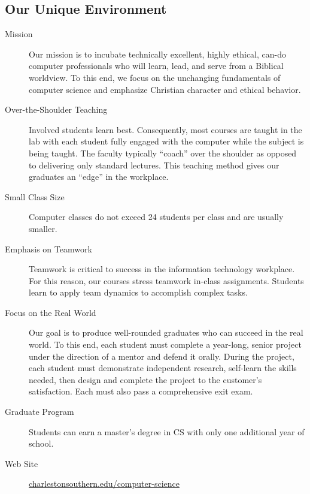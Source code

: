 \subsection{Our Unique Environment}
\begin{description}
	\item[Mission] Our mission is to incubate technically excellent, highly ethical, can-do computer professionals who will learn, lead, and serve from a Biblical worldview. To this end, we focus on the unchanging fundamentals of computer science and emphasize Christian character and ethical behavior.
	\item[Over-the-Shoulder Teaching] Involved students learn best. Consequently, most courses are taught in the lab with each student fully engaged with the computer while the subject is being taught. The faculty typically “coach” over the shoulder as opposed to delivering only standard lectures. This teaching method gives our graduates an “edge” in the workplace.
	\item[Small Class Size] Computer classes do not exceed 24 students per class and are usually smaller.
	\item[Emphasis on Teamwork] Teamwork is critical to success in the information technology workplace. For this reason, our courses stress teamwork in-class assignments. Students learn to apply team dynamics to accomplish complex tasks.
	\item[Focus on the Real World] Our goal is to produce well-rounded graduates who can succeed in the real world.  To this end, each student must complete a year-long, senior project under the direction of a mentor and defend it orally. During the project, each student must demonstrate independent research, self-learn the skills needed, then design and complete the project to the customer’s satisfaction.  Each must also pass a comprehensive exit exam.
	\item[Graduate Program] Students can earn a master’s degree in CS with only one additional year of school.
	\item[Web Site] \href{https://charlestonsouthern.edu/computer-science}{charlestonsouthern.edu/computer-science}
\end{description}